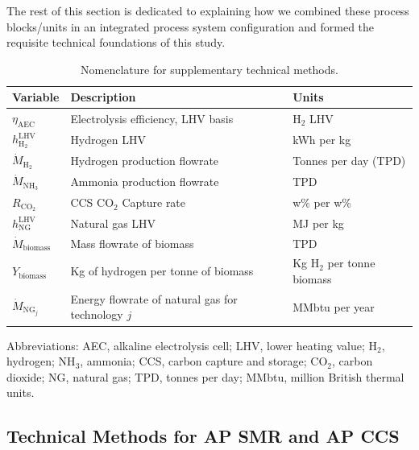 \documentclass{article}
\begin{document}
The rest of this section is dedicated to explaining how we combined these process blocks/units in an integrated process system configuration and formed the requisite technical foundations of this study.

\begin{table}[H]
  \centering
  \caption{Nomenclature for supplementary technical methods.}
  \label{table:si_techical1_nomenclature}
  \begin{threeparttable}
    \begin{tabular}{@{}lll@{}}
      \toprule
      \textbf{Variable} & \textbf{Description} & \textbf{Units} \\ \midrule
      $\eta_{\text{AEC}}$ & Electrolysis efficiency, LHV basis & H$_2$ LHV \\ 
      $h_{\text{H}_2}^{\text{LHV}}$ & Hydrogen LHV & kWh per kg \\ 
      $\dot{M}_{\text{H}_2}$ & Hydrogen production flowrate & Tonnes per day (TPD) \\ 
      $\dot{M}_{\text{NH}_3}$ & Ammonia production flowrate & TPD \\ 
      $R_{\text{CO}_2}$ & CCS CO$_2$ Capture rate & w\% per w\% \\ 
      $h_{\text{NG}}^{\text{LHV}}$ & Natural gas LHV & MJ per kg \\ 
      $\dot{M}_{\text{biomass}}$ & Mass flowrate of biomass & TPD \\ 
      $Y_{\text{biomass}}$ & Kg of hydrogen per tonne of biomass & Kg H$_2$ per tonne biomass \\ 
      $\dot{M}_{\text{NG}_j}$ & Energy flowrate of natural gas for technology $j$ & MMbtu per year \\ \bottomrule
    \end{tabular}
    \begin{tablenotes}
      \small
      \item Abbreviations: AEC, alkaline electrolysis cell; LHV, lower heating value; H$_2$, hydrogen; NH$_3$, ammonia; CCS, carbon capture and storage; CO$_2$, carbon dioxide; NG, natural gas; TPD, tonnes per day; MMbtu, million British thermal units.
    \end{tablenotes}
  \end{threeparttable}
\end{table}


\subsection{Technical Methods for AP SMR and AP CCS}
\end{document}
